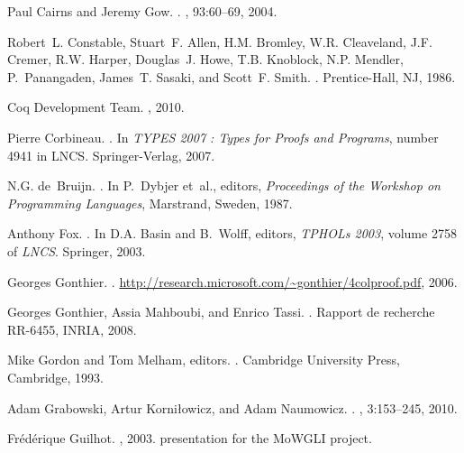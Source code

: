 \documentclass{LMCS}
\begin{document}
\begin{thebibliography}{10}
Paul Cairns and Jeremy Gow.
.
, 93:60--69,
  2004.

Robert~L. Constable, Stuart~F. Allen, H.M. Bromley, W.R. Cleaveland, J.F.
  Cremer, R.W. Harper, Douglas~J. Howe, T.B. Knoblock, N.P. Mendler,
  P.~Panangaden, James~T. Sasaki, and Scott~F. Smith.
.
\newblock Prentice-Hall, NJ, 1986.

{Coq Development Team}.
, 2010.

Pierre Corbineau.
.
\newblock In {\em TYPES 2007 : Types for Proofs and Programs}, number 4941 in
  {LNCS}. Springer-Verlag, 2007.

N.G. de~Bruijn.
.
\newblock In P.~Dybjer et~al., editors, {\em Proceedings of the Workshop on
  Programming Languages}, Marstrand, Sweden, 1987.

Anthony Fox.
.
\newblock In D.A. Basin and B.~Wolff, editors, {\em TPHOLs 2003}, volume 2758
  of {\em LNCS}. Springer, 2003.

Georges Gonthier.
.
\newblock \url{http://research.microsoft.com/~gonthier/4colproof.pdf}, 2006.

Georges Gonthier, Assia Mahboubi, and Enrico Tassi.
.
\newblock Rapport de recherche RR-6455, INRIA, 2008.

Mike Gordon and Tom Melham, editors.
.
\newblock Cambridge University Press, Cambridge, 1993.

Adam Grabowski, Artur Korni{\l}owicz, and Adam Naumowicz.
.
, 3:153--245, 2010.

Fr\'ed\'erique Guilhot.
, 2003.
\newblock presentation for the MoWGLI project.


\end{thebibliography}
\end{document}
